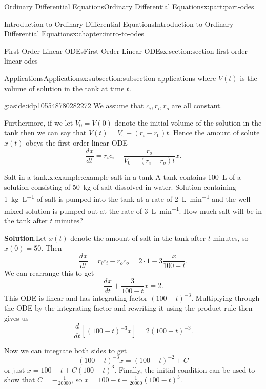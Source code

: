 \documentclass[oneside,10pt,]{book}
\newcommand{\blocktitlefont}{\relax}
\numberwithin{equation}{part}
\newcommand{\dv}[3][]{\dfrac{d^{#1} #2}{d #3^{#1}}}
\begin{document}
\begin{partptx}{Ordinary Differential Equations}{}{Ordinary Differential Equations}{}{}{x:part:part-odes}
\begin{chapterptx}{Introduction to Ordinary Differential Equations}{}{Introduction to Ordinary Differential Equations}{}{}{x:chapter:intro-to-odes}
\begin{sectionptx}{First-Order Linear ODEs}{}{First-Order Linear ODEs}{}{}{x:section:section-first-order-linear-odes}
\begin{subsectionptx}{Applications}{}{Applications}{}{}{x:subsection:subsection-applications}
where \(V(t)\) is the volume of solution in the tank at time \(t\). \begin{aside}{}{g:aside:idp105548780282272}%
We assume that \(c_{i},r_{i},r_{o}\) are all constant.%
\end{aside}
 Furthermore, if we let \(V_{0} = V(0)\) denote the initial volume of the solution in the tank then we can say that \(V(t) = V_{0} + (r_{i}-r_{0})t.\) Hence the amount of solute \(x(t)\) obeys the first-order linear ODE%
\begin{equation*}
\dv{x}{t} = r_{i}c_{i} - \frac{r_{o}}{V_{0}+(r_{i}-r_{o})t}x.
\end{equation*}
%
\begin{example}{Salt in a tank.}{x:example:example-salt-in-a-tank}%
A tank contains \SI{100}{\liter} of a solution consisting of \SI{50}{\kilo\gram} of salt dissolved in water. Solution containing \SI{1}{\kilo\gram\per\liter} of salt is pumped into the tank at a rate of \SI{2}{\liter\per\minute} and the well-mixed solution is pumped out at the rate of \SI{3}{\liter\per\minute}. How much salt will be in the tank after \(t\) minutes?%
\par\smallskip%
\noindent\textbf{\blocktitlefont Solution}.\hypertarget{g:solution:idp105548780290848}{}\quad{}Let \(x(t)\) denote the amount of salt in the tank after \(t\) minutes, so \(x(0) = 50\). Then%
\begin{equation*}
\dv{x}{t} = r_{i}c_{i}-r_{o}c_{o} = 2\cdot1-3\frac{x}{100-t}.
\end{equation*}
We can rearrange this to get%
\begin{equation*}
\dv{x}{t} + \frac{3}{100-t}x = 2.
\end{equation*}
This ODE is linear and has integrating factor \((100-t)^{-3}\). Multiplying through the ODE by the integrating factor and rewriting it using the product rule then gives us%
\begin{equation*}
\dv{}{t}[(100-t)^{-3}x] = 2(100-t)^{-3}.
\end{equation*}
%
\par
Now we can integrate both sides to get%
\begin{equation*}
(100-t)^{-3}x = (100-t)^{-2}+C
\end{equation*}
or just \(x = 100-t+C(100-t)^{3}\). Finally, the initial condition can be used to show that \(C = -\frac{1}{20000}\), so \(x = 100-t - \frac{1}{20000}(100-t)^{3}\).%
\end{example}
\end{subsectionptx}
\begin{conclusion}{}%

\end{conclusion}
\end{sectionptx}
\end{chapterptx}
\end{partptx}
\end{document}
